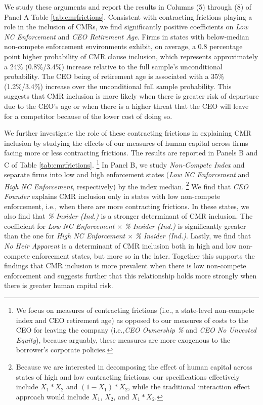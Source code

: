 \documentclass[a4paper,12pt]{article}
\begin{document}
We study these arguments and report the results in Columns (5) through (8) of Panel A Table \ref{tab:cmrfrictions}.
Consistent with contracting frictions playing a role in the inclusion of CMRs, we find significantly positive coefficients on \textit{Low NC Enforcement} and \textit{CEO Retirement Age}.
Firms in states with below-median non-compete enforcement environments exhibit, on average, a 0.8 percentage point higher probability of CMR clause inclusion, which represents approximately a 24\% (0.8\%/3.4\%) increase relative to the full sample's unconditional probability.
The CEO being of retirement age is associated with a 35\% (1.2\%/3.4\%) increase over the unconditional full sample probability.
This suggests that CMR inclusion is more likely when there is greater risk of departure due to the CEO's age or when there is a higher threat that the CEO will leave for a competitor because of the lower cost of doing so.



We further investigate the role of these contracting frictions in explaining CMR inclusion by studying the effects of our measures of human capital across firms facing more or less contracting frictions.
The results are reported in Panels B and C of Table \ref{tab:cmrfrictions}.%
    \footnote{We focus on measures of contracting frictions (i.e., a state-level non-compete index and CEO retirement age) as opposed to our measures of costs to the CEO for leaving the company (i.e.,\textit{CEO Ownership \%} and \textit{CEO No Unvested Equity}), because arguably, these measures are more exogenous to the borrower's corporate policies.} 
In Panel B, we study \textit{Non-Compete Index} and separate firms into low and high enforcement states (\textit{Low NC Enforcement} and \textit{High NC Enforcement}, respectively) by the index median.%
    \footnote{Because we are interested in decomposing the effect of human capital across states of high and low contracting frictions, our specifications effectively include $X_1*X_2$ and $(1-X_1)*X_2$, while the traditional interaction effect approach would include $X_1$, $X_2$, and $X_1*X_2$.}
We find that \textit{CEO Founder} explains CMR inclusion only in states with low non-compete enforcement, i.e., when there are more contracting frictions.
In these states, we also find that \textit{\% Insider (Ind.)} is a stronger determinant of CMR inclusion.
The coefficient for \textit{Low NC Enforcement} $\times$ \textit{\% Insider (Ind.)} is significantly greater than the one for \textit{High NC Enforcement} $\times$ \textit{\% Insider (Ind.)}.
Lastly, we find that \textit{No Heir Apparent} is a determinant of CMR inclusion both in high and low non-compete enforcement states, but more so in the later.
Together this supports the findings that CMR inclusion is more prevalent when there is low non-compete enforcement and suggests further that this relationship holds more strongly when there is greater human capital risk.
\end{document}
